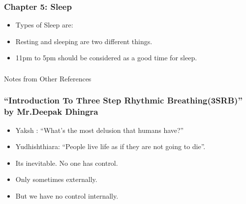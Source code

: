 \begin{frame}[fragile]
\frametitle{Chapter 5: Sleep}
\begin{itemize}
\item Types of Sleep are:

\item Resting and sleeping are two different things.
\item 11pm to 5pm should be considered as a good time for sleep.
\end{itemize}
\end{frame}








\begin{frame}[fragile]\frametitle{}
\begin{center}
{\Large Notes from Other References}
\end{center}
\end{frame}


\begin{frame}[fragile]
\frametitle{``Introduction To Three Step Rhythmic Breathing(3SRB)'' by Mr.Deepak Dhingra}


\begin{itemize}
\item Yaksh : ``What's the most delusion that humans have?''
\item Yudhishthiara: ``People live life as if they are not going to die''.
\item Its inevitable. No one has control. 
\item Only sometimes externally.
\item But we have no control internally. 
\end{itemize}
\end{frame}


